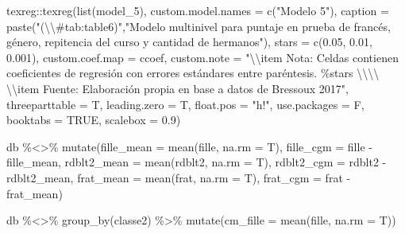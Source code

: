 \documentclass[
  12pt,
  a4paper,
]{article}
\newenvironment{Shaded}{\begin{snugshade}}{\end{snugshade}}
\newcommand{\AttributeTok}[1]{\textcolor[rgb]{0.77,0.63,0.00}{#1}}
\newcommand{\ConstantTok}[1]{\textcolor[rgb]{0.00,0.00,0.00}{#1}}
\newcommand{\FloatTok}[1]{\textcolor[rgb]{0.00,0.00,0.81}{#1}}
\newcommand{\FunctionTok}[1]{\textcolor[rgb]{0.00,0.00,0.00}{#1}}
\newcommand{\NormalTok}[1]{#1}
\newcommand{\SpecialCharTok}[1]{\textcolor[rgb]{0.00,0.00,0.00}{#1}}
\newcommand{\StringTok}[1]{\textcolor[rgb]{0.31,0.60,0.02}{#1}}
\begin{document}
\begin{Shaded}
\begin{Highlighting}[]
\NormalTok{texreg}\SpecialCharTok{::}\FunctionTok{texreg}\NormalTok{(}\FunctionTok{list}\NormalTok{(model\_5),}
               \AttributeTok{custom.model.names =} \FunctionTok{c}\NormalTok{(}\StringTok{"Modelo 5"}\NormalTok{),}
               \AttributeTok{caption =} \FunctionTok{paste}\NormalTok{(}\StringTok{"(}\SpecialCharTok{\textbackslash{}\textbackslash{}}\StringTok{\#tab:table6)"}\NormalTok{,}\StringTok{"Modelo multinivel para puntaje en prueba de francés, género, repitencia del curso y cantidad de hermanos"}\NormalTok{),}
               \AttributeTok{stars =} \FunctionTok{c}\NormalTok{(}\FloatTok{0.05}\NormalTok{, }\FloatTok{0.01}\NormalTok{, }\FloatTok{0.001}\NormalTok{),}
               \AttributeTok{custom.coef.map =}\NormalTok{ ccoef,}
               \AttributeTok{custom.note =} \StringTok{"}\SpecialCharTok{\textbackslash{}\textbackslash{}}\StringTok{item Nota: Celdas contienen coeficientes de regresión con errores estándares entre paréntesis. \%stars }\SpecialCharTok{\textbackslash{}\textbackslash{}\textbackslash{}\textbackslash{}}\StringTok{ }\SpecialCharTok{\textbackslash{}\textbackslash{}}\StringTok{item Fuente: Elaboración propia en base a datos de Bressoux 2017"}\NormalTok{,}
               \AttributeTok{threeparttable =}\NormalTok{ T,}
               \AttributeTok{leading.zero =}\NormalTok{ T,}
               \AttributeTok{float.pos =} \StringTok{"h!"}\NormalTok{,}
               \AttributeTok{use.packages =}\NormalTok{ F,}
               \AttributeTok{booktabs =} \ConstantTok{TRUE}\NormalTok{,}
               \AttributeTok{scalebox =} \FloatTok{0.9}\NormalTok{)}



\NormalTok{db }\SpecialCharTok{\%\textless{}\textgreater{}\%} 
  \FunctionTok{mutate}\NormalTok{(}\AttributeTok{fille\_mean =} \FunctionTok{mean}\NormalTok{(fille, }\AttributeTok{na.rm =}\NormalTok{ T),}
         \AttributeTok{fille\_cgm =}\NormalTok{ fille }\SpecialCharTok{{-}}\NormalTok{ fille\_mean,}
         \AttributeTok{rdblt2\_mean =} \FunctionTok{mean}\NormalTok{(rdblt2, }\AttributeTok{na.rm =}\NormalTok{ T),}
         \AttributeTok{rdblt2\_cgm =}\NormalTok{ rdblt2 }\SpecialCharTok{{-}}\NormalTok{ rdblt2\_mean,}
         \AttributeTok{frat\_mean =} \FunctionTok{mean}\NormalTok{(frat, }\AttributeTok{na.rm =}\NormalTok{ T),}
         \AttributeTok{frat\_cgm =}\NormalTok{ frat }\SpecialCharTok{{-}}\NormalTok{ frat\_mean)}

\NormalTok{db }\SpecialCharTok{\%\textless{}\textgreater{}\%} 
  \FunctionTok{group\_by}\NormalTok{(classe2) }\SpecialCharTok{\%\textgreater{}\%} 
  \FunctionTok{mutate}\NormalTok{(}\AttributeTok{cm\_fille =} \FunctionTok{mean}\NormalTok{(fille, }\AttributeTok{na.rm =}\NormalTok{ T))}


\end{Highlighting}
\end{Shaded}
\end{document}
